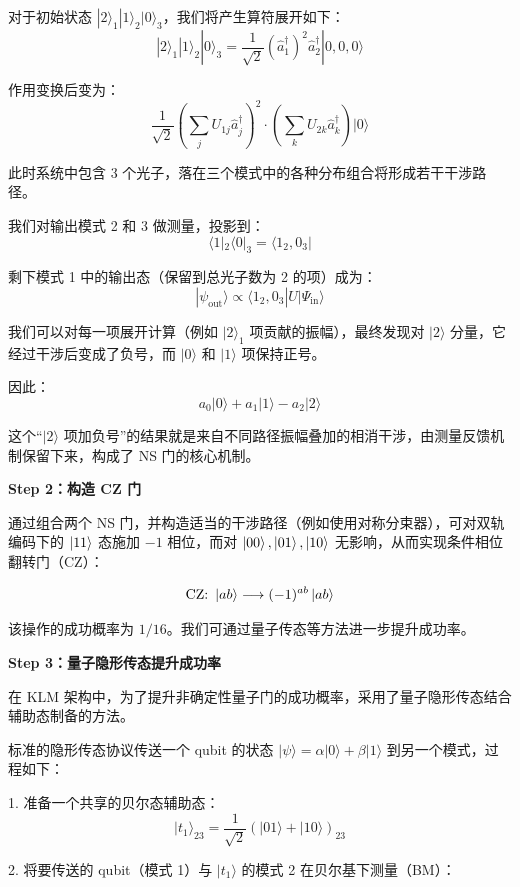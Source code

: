 \documentclass[hyperref, fntef, fancyhdr,zihao = -4,UTF8]{ctexart}
\begin{document}
对于初始状态 $|2\rangle_1 |1\rangle_2 |0\rangle_3$，我们将产生算符展开如下：
\[
|2\rangle_1 |1\rangle_2 |0\rangle_3 = \frac{1}{\sqrt{2}} (\hat{a}_1^\dagger)^2 \hat{a}_2^\dagger |0,0,0\rangle
\]

作用变换后变为：
\[
\frac{1}{\sqrt{2}} \left( \sum_{j} U_{1j} \hat{a}_j^\dagger \right)^2 \cdot \left( \sum_{k} U_{2k} \hat{a}_k^\dagger \right) |0\rangle
\]

此时系统中包含 3 个光子，落在三个模式中的各种分布组合将形成若干干涉路径。

我们对输出模式 2 和 3 做测量，投影到：
\[
\langle 1|_2 \langle 0|_3 = \langle 1_2, 0_3|
\]

剩下模式 1 中的输出态（保留到总光子数为 2 的项）成为：
\[
|\psi_{\text{out}}\rangle \propto \langle 1_2, 0_3| U |\Psi_{\text{in}}\rangle
\]

我们可以对每一项展开计算（例如 $|2\rangle_1$ 项贡献的振幅），最终发现对 $|2\rangle$ 分量，它经过干涉后变成了负号，而 $|0\rangle$ 和 $|1\rangle$ 项保持正号。

因此：
\[
a_0|0\rangle + a_1|1\rangle - a_2|2\rangle
\]

这个“$|2\rangle$ 项加负号”的结果就是来自不同路径振幅叠加的相消干涉，由测量反馈机制保留下来，构成了 NS 门的核心机制。


\vspace{0.5em}

\textbf{Step 2：构造 CZ 门}

通过组合两个 NS 门，并构造适当的干涉路径（例如使用对称分束器），可对双轨编码下的 $\ket{11}$ 态施加 $-1$ 相位，而对 $\ket{00}, \ket{01}, \ket{10}$ 无影响，从而实现条件相位翻转门（CZ）：

\[
\text{CZ: } \ket{ab} \longrightarrow (-1)^{ab} \ket{ab}
\]\cite{knill2001klm}

该操作的成功概率为 $1/16$。我们可通过量子传态等方法进一步提升成功率。

\vspace{0.5em}

\textbf{Step 3：量子隐形传态提升成功率}

在 KLM 架构中，为了提升非确定性量子门的成功概率，采用了量子隐形传态结合辅助态制备的方法。\cite{knill2001klm}

标准的隐形传态协议传送一个 qubit 的状态 $|\psi\rangle = \alpha |0\rangle + \beta |1\rangle$ 到另一个模式，过程如下：


1. 准备一个共享的贝尔态辅助态：
\[
|t_1\rangle_{23} = \frac{1}{\sqrt{2}} (|01\rangle + |10\rangle)_{23}
\]

2. 将要传送的 qubit（模式 1）与 $|t_1\rangle$ 的模式 2 在贝尔基下测量（BM）：
\end{document}
